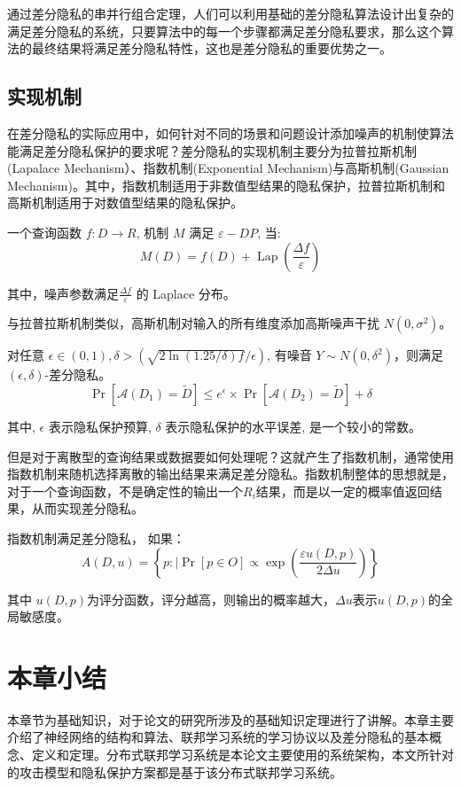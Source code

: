 通过差分隐私的串并行组合定理，人们可以利用基础的差分隐私算法设计出复杂的满足差分隐私的系统，只要算法中的每一个步骤都满足差分隐私要求，那么这个算法的最终结果将满足差分隐私特性，这也是差分隐私的重要优势之一。 

\subsection{实现机制}
在差分隐私的实际应用中，如何针对不同的场景和问题设计添加噪声的机制使算法能满足差分隐私保护的要求呢？差分隐私的实现机制主要分为拉普拉斯机制(Lapalace Mechanism）、指数机制(Exponential Mechanism)与高斯机制(Gaussian Mechanism)。其中，指数机制适用于非数值型结果的隐私保护，拉普拉斯机制和高斯机制适用于对数值型结果的隐私保护。

\begin{theorem}[拉普拉斯机制]\label{拉普拉斯机制}
一个查询函数 $f: D \rightarrow R$, 机制 $M$ 满足 $\varepsilon-D P$, 当:
$$
M(D)=f(D)+\operatorname{Lap}\left(\frac{\Delta f}{\varepsilon}\right)
$$
\end{theorem}
其中，噪声参数满足$\frac{\Delta f}{\varepsilon}$ 的 Laplace 分布。

与拉普拉斯机制类似，高斯机制对输入的所有维度添加高斯噪声干扰 $N\left(0,\sigma^{2}\right)$。
\begin{theorem}[高斯机制]\label{高斯机制}
对任意 $\epsilon \in(0,1), \delta>(\sqrt{2 \ln (1.25 / \delta) f} / \epsilon)$, 有噪音 $Y \sim N\left(0, \delta^{2}\right)$，则满足 $(\epsilon, \delta)$-差分隐私。
$$
\operatorname{Pr}\left[\mathscr{A}\left(D_{1}\right)=\tilde{D}\right] \leq e^{\epsilon} \times \operatorname{Pr}\left[\mathscr{A}\left(D_{2}\right)=\tilde{D}\right]+\delta
$$
\end{theorem}

其中, $\epsilon$ 表示隐私保护预算, $\delta$ 表示隐私保护的水平误差, 是一个较小的常数。

但是对于离散型的查询结果或数据要如何处理呢？这就产生了指数机制，通常使用指数机制来随机选择离散的输出结果来满足差分隐私。指数机制整体的思想就是，对于一个查询函数，不是确定性的输出一个$R_{i}$结果，而是以一定的概率值返回结果，从而实现差分隐私。

\begin{theorem}[指数机制]\label{指数机制}
指数机制满足差分隐私， 如果：
$$
A(D,u)=\left\{p: \mid \operatorname{Pr}[p \in O] \propto \exp \left(\frac{\varepsilon u(D,p)}{2 \Delta u}\right)\right\}
$$
\end{theorem}
其中 $u(D,p)$为评分函数，评分越高，则输出的概率越大，$\Delta u$表示$u(D,p)$的全局敏感度。

\section{本章小结}
本章节为基础知识，对于论文的研究所涉及的基础知识定理进行了讲解。本章主要介绍了神经网络的结构和算法、联邦学习系统的学习协议以及差分隐私的基本概念、定义和定理。分布式联邦学习系统是本论文主要使用的系统架构，本文所针对的攻击模型和隐私保护方案都是基于该分布式联邦学习系统。

